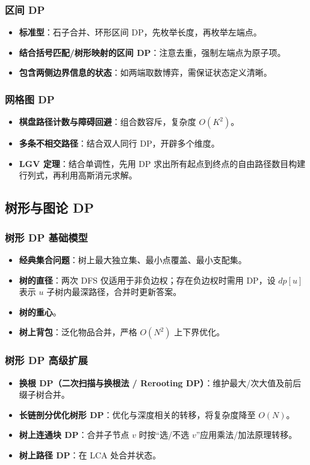 \subsubsection{区间 DP}
\begin{itemize}
    \item \textbf{标准型}：石子合并、环形区间 DP，先枚举长度，再枚举左端点。
    \item \textbf{结合括号匹配/树形映射的区间 DP}：注意去重，强制左端点为原子项。
    \item \textbf{包含两侧边界信息的状态}：如两端取数博弈，需保证状态定义清晰。
\end{itemize}

\subsubsection{网格图 DP}
\begin{itemize}
    \item \textbf{棋盘路径计数与障碍回避}：组合数容斥，复杂度 $O(K^2)$。
    \item \textbf{多条不相交路径}：结合双人同行 DP，开辟多个维度。
    \item \textbf{LGV 定理}：结合单调性，先用 DP 求出所有起点到终点的自由路径数目构建行列式，再利用高斯消元求解。
\end{itemize}


\subsection{树形与图论 DP}

\subsubsection{树形 DP 基础模型}
\begin{itemize}
    \item \textbf{经典集合问题}：树上最大独立集、最小点覆盖、最小支配集。
    \item \textbf{树的直径}：两次 DFS 仅适用于非负边权；存在负边权时需用 DP，设 $dp[u]$ 表示 $u$ 子树内最深路径，合并时更新答案。
    \item \textbf{树的重心}。
    \item \textbf{树上背包}：泛化物品合并，严格 $O(N^2)$ 上下界优化。
\end{itemize}

\subsubsection{树形 DP 高级扩展}
\begin{itemize}
    \item \textbf{换根 DP（二次扫描与换根法 / Rerooting DP）}：维护最大/次大值及前后缀子树合并。
    \item \textbf{长链剖分优化树形 DP}：优化与深度相关的转移，将复杂度降至 $O(N)$。
    \item \textbf{树上连通块 DP}：合并子节点 $v$ 时按“选/不选 $v$”应用乘法/加法原理转移。
    \item \textbf{树上路径 DP}：在 LCA 处合并状态。
\end{itemize}

